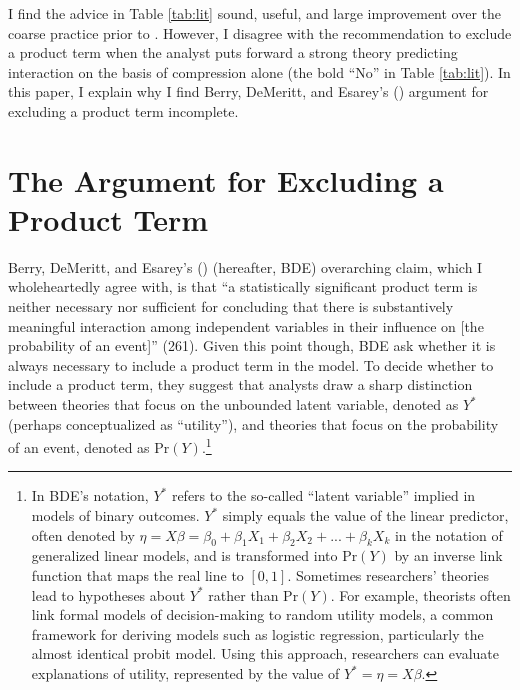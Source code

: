 \documentclass[12pt]{article}
\begin{document}
I find the advice in Table \ref{tab:lit} sound, useful, and large improvement over the coarse practice prior to \cite{BerryDeMerittEsarey2010}. However, I disagree with the recommendation to exclude a product term when the analyst puts forward a strong theory predicting interaction on the basis of compression alone (the bold ``No'' in Table \ref{tab:lit}). In this paper, I explain why I find Berry, DeMeritt, and Esarey's (\citeyear{BerryDeMerittEsarey2010}) argument for excluding a product term incomplete.

\section*{The Argument for Excluding a Product Term}

Berry, DeMeritt, and Esarey's (\citeyear{BerryDeMerittEsarey2010}) (hereafter, BDE) overarching claim, which I wholeheartedly agree with, is that ``a statistically significant product term is neither necessary nor sufficient for concluding that there is substantively meaningful interaction among independent variables in their influence on [the probability of an event]'' (261). Given this point though, BDE ask whether it is always necessary to include a product term in the model. To decide whether to include a product term, they suggest that analysts draw a sharp distinction between theories that focus on the unbounded latent variable, denoted as $Y^*$ (perhaps conceptualized as ``utility''), and theories that focus on the probability of an event, denoted as $\text{Pr}(Y)$.\footnote{In BDE's notation, $Y^*$ refers to the so-called ``latent variable'' implied in models of binary outcomes. $Y^*$ simply equals the value of the linear predictor, often denoted by $\eta = X\beta = \beta_0 + \beta_1X_1 + \beta_2X_2 + ... + \beta_kX_k$ in the notation of generalized linear models, and is transformed into $\text{Pr}(Y)$ by an inverse link function that maps the real line to $[0, 1]$. Sometimes researchers' theories lead to hypotheses about $Y^*$ rather than $\text{Pr}(Y)$. For example, theorists often link formal models of decision-making to random utility models, a common framework for deriving models such as logistic regression, particularly the almost identical probit model. Using this approach, researchers can evaluate explanations of utility, represented by the value of $Y^* = \eta = X\beta$.}
\end{document}

